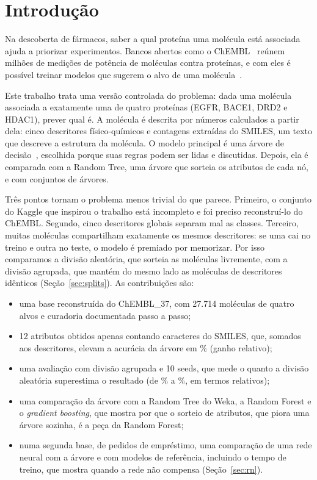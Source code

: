 \section{Introdução}

Na descoberta de fármacos, saber a qual proteína uma molécula está associada ajuda a priorizar experimentos. Bancos abertos como o ChEMBL~\cite{gaulton:12,zdrazil:24} reúnem milhões de medições de potência de moléculas contra proteínas, e com eles é possível treinar modelos que sugerem o alvo de uma molécula~\cite{keiser:07}.

Este trabalho trata uma versão controlada do problema: dada uma molécula associada a exatamente uma de quatro proteínas (EGFR, BACE1, DRD2 e HDAC1), prever qual é. A molécula é descrita por números calculados a partir dela: cinco descritores físico-químicos e contagens extraídas do SMILES, um texto que descreve a estrutura da molécula. O modelo principal é uma árvore de decisão~\cite{breiman:84}, escolhida porque suas regras podem ser lidas e discutidas. Depois, ela é comparada com a Random Tree, uma árvore que sorteia os atributos de cada nó, e com conjuntos de árvores.

Três pontos tornam o problema menos trivial do que parece. Primeiro, o conjunto do Kaggle que inspirou o trabalho está incompleto e foi preciso reconstruí-lo do ChEMBL. Segundo, cinco descritores globais separam mal as classes. Terceiro, muitas moléculas compartilham exatamente os mesmos descritores: se uma cai no treino e outra no teste, o modelo é premiado por memorizar. Por isso comparamos a divisão aleatória, que sorteia as moléculas livremente, com a divisão agrupada, que mantém do mesmo lado as moléculas de descritores idênticos (Seção~\ref{sec:splits}). As contribuições são:
\begin{itemize}
  \item uma base reconstruída do ChEMBL\_37, com 27.714 moléculas de quatro alvos e curadoria documentada passo a passo;
  \item 12 atributos obtidos apenas contando caracteres do SMILES, que, somados aos descritores, elevam a acurácia da árvore em \ganhoAmbos\% (ganho relativo);
  \item uma avaliação com divisão agrupada e 10 seeds, que mede o quanto a divisão aleatória superestima o resultado (de \gapMin\% a \gapMax\%, em termos relativos);
  \item uma comparação da árvore com a Random Tree do Weka, a Random Forest e o \emph{gradient boosting}, que mostra por que o sorteio de atributos, que piora uma árvore sozinha, é a peça da Random Forest;
  \item numa segunda base, de pedidos de empréstimo, uma comparação de uma rede neural com a árvore e com modelos de referência, incluindo o tempo de treino, que mostra quando a rede não compensa (Seção~\ref{sec:rn}).
\end{itemize}

